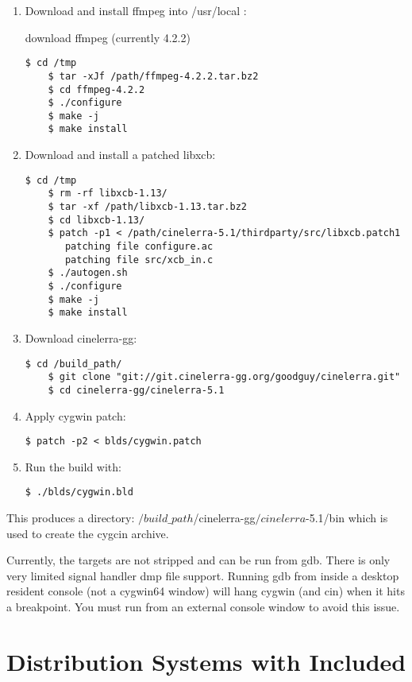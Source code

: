 \begin{enumerate}
	\item Download and install ffmpeg into /usr/local :

   	download ffmpeg (currently 4.2.2)
\begin{lstlisting}[numbers=none]
	$ cd /tmp
	$ tar -xJf /path/ffmpeg-4.2.2.tar.bz2
	$ cd ffmpeg-4.2.2
	$ ./configure
	$ make -j
	$ make install
\end{lstlisting}
	\item Download and install a patched libxcb:
\begin{lstlisting}[numbers=none]
	$ cd /tmp
	$ rm -rf libxcb-1.13/
	$ tar -xf /path/libxcb-1.13.tar.bz2
	$ cd libxcb-1.13/
	$ patch -p1 < /path/cinelerra-5.1/thirdparty/src/libxcb.patch1
	   patching file configure.ac
	   patching file src/xcb_in.c
	$ ./autogen.sh
	$ ./configure
	$ make -j
	$ make install
\end{lstlisting}
	\item Download cinelerra-gg:
\begin{lstlisting}[numbers=none]
	$ cd /build_path/
	$ git clone "git://git.cinelerra-gg.org/goodguy/cinelerra.git"
	$ cd cinelerra-gg/cinelerra-5.1
\end{lstlisting}
	\item Apply cygwin patch:
\begin{lstlisting}[numbers=none]
	$ patch -p2 < blds/cygwin.patch
\end{lstlisting}
	\item Run the build with:
\begin{lstlisting}[numbers=none]
	$ ./blds/cygwin.bld
\end{lstlisting}
\end{enumerate}

This produces a directory: $/build\_path$/cinelerra-gg$/cinelerra$-5.1/bin \newline
which is used to create the cygcin archive.

Currently, the targets are not stripped and can be run from gdb.
There is only very limited signal handler dmp file support.
Running gdb from inside a desktop resident console (not a cygwin64 window) will hang cygwin (and cin) when it hits a breakpoint.  You must run from an external console window to avoid this issue.


\section{Distribution Systems with \CGG{} Included}%
\label{sec:distribution_systems_with_cinelerra_included}

